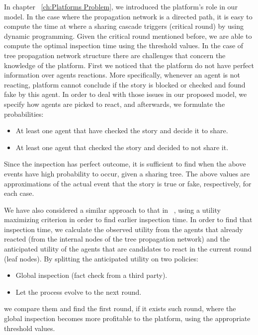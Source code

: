 In chapter ~\ref{ch:Platforms Problem}, we introduced the platform's role in our model. In the case where the propagation network is a directed path, it is easy to compute the time at where a sharing cascade triggers (critical round) by using dynamic programming. Given the critical round mentioned before, we are able to compute the optimal inspection time using the threshold values. In the case of tree propagation network structure there are challenges that concern the knowledge of the platform. First we noticed that the platform do not have perfect information over agents reactions. More specifically, whenever an agent is not reacting, platform cannot conclude if the story is blocked or checked and found fake by this agent. In order to deal with those issues in our proposed model, we specify how agents are picked to react, and afterwards, we formulate the probabilities:
\begin{itemize}
	\item At least one agent that have checked the story and decide it to share.
	\item At least one agent that checked the story and decided to not share it.
	
\end{itemize}
Since the inspection has perfect outcome, it is sufficient to find when the above events have high probability to occur, given a sharing tree. The above values are approximations of the actual event that the story is true or fake, respectively, for each case.

We have also considered a similar approach to that in ~\cite{papanastasiou}, using a utility maximizing criterion in order to find earlier inspection time. In order to find that inspection time, we calculate the observed utility from the agents that already reacted (from the internal nodes of the tree propagation network) and the anticipated utility of the agents that are candidates to react in the current round (leaf nodes). By splitting the anticipated utility on two policies:

\begin{itemize}
	\item Global inspection (fact check from a third party).
	\item Let the process evolve to the next round.
\end{itemize}
we compare them and find the first round, if it exists such round, where the global inspection becomes more profitable to the platform, using the appropriate threshold values.

